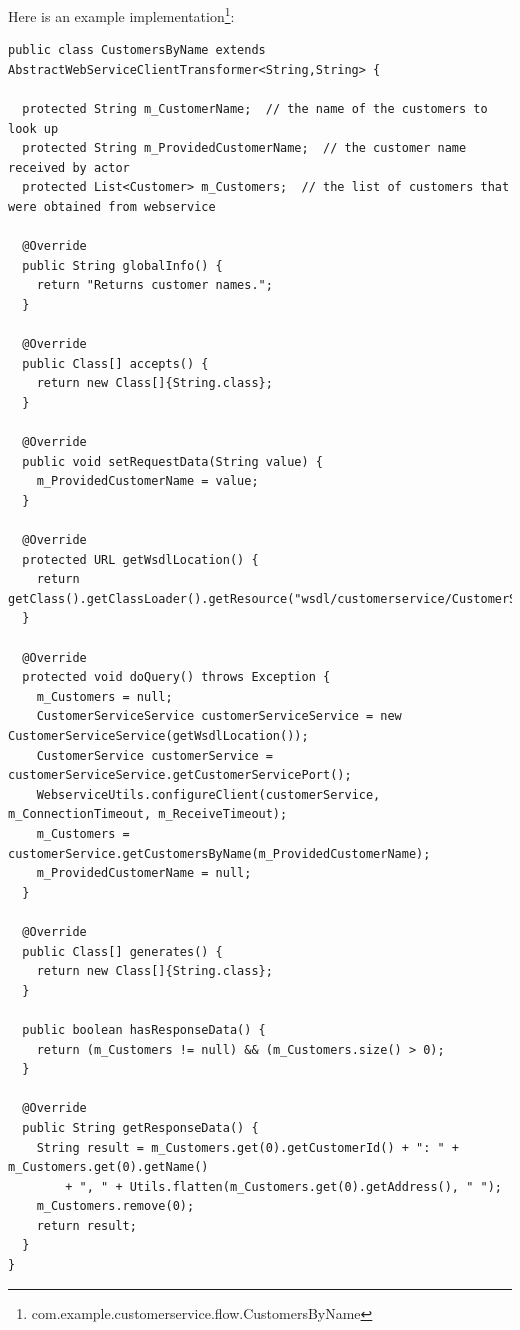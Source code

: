 \documentclass[a4paper]{book}
\begin{document}
Here is an example 
implementation\footnote{com.example.customerservice.flow.CustomersByName}:
{\scriptsize
\begin{verbatim}
public class CustomersByName extends AbstractWebServiceClientTransformer<String,String> {
  
  protected String m_CustomerName;  // the name of the customers to look up
  protected String m_ProvidedCustomerName;  // the customer name received by actor
  protected List<Customer> m_Customers;  // the list of customers that were obtained from webservice

  @Override
  public String globalInfo() {
    return "Returns customer names.";
  }

  @Override
  public Class[] accepts() {
    return new Class[]{String.class};
  }

  @Override
  public void setRequestData(String value) {
    m_ProvidedCustomerName = value;
  }

  @Override
  protected URL getWsdlLocation() {
    return getClass().getClassLoader().getResource("wsdl/customerservice/CustomerService.wsdl");
  }

  @Override
  protected void doQuery() throws Exception {
    m_Customers = null;
    CustomerServiceService customerServiceService = new CustomerServiceService(getWsdlLocation());
    CustomerService customerService = customerServiceService.getCustomerServicePort();
    WebserviceUtils.configureClient(customerService, m_ConnectionTimeout, m_ReceiveTimeout);
    m_Customers = customerService.getCustomersByName(m_ProvidedCustomerName);
    m_ProvidedCustomerName = null;
  }

  @Override
  public Class[] generates() {
    return new Class[]{String.class};
  }
  
  public boolean hasResponseData() {
    return (m_Customers != null) && (m_Customers.size() > 0);
  }

  @Override
  public String getResponseData() {
    String result = m_Customers.get(0).getCustomerId() + ": " + m_Customers.get(0).getName() 
        + ", " + Utils.flatten(m_Customers.get(0).getAddress(), " ");
    m_Customers.remove(0);
    return result;
  }
}
\end{verbatim}
}
\end{document}
